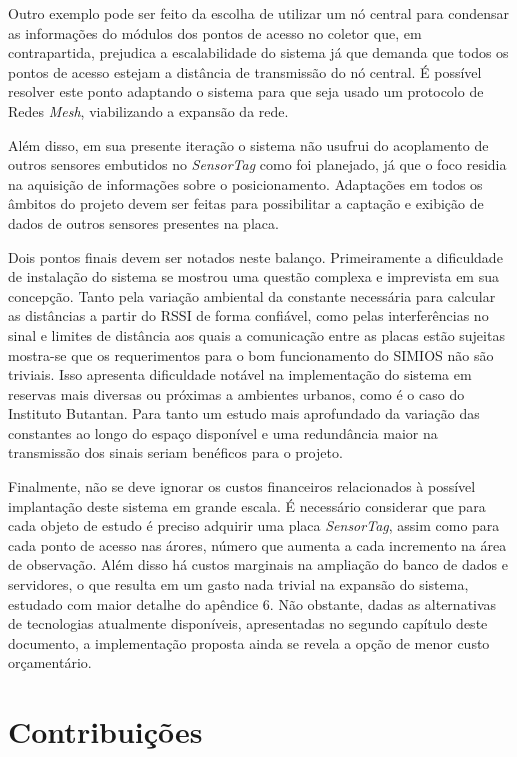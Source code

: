 Outro exemplo pode ser feito da escolha de utilizar um nó central para condensar as informações do módulos dos pontos de acesso no coletor que, em contrapartida, prejudica a escalabilidade do sistema já que demanda que todos os pontos de acesso estejam a distância de transmissão do nó central. É possível resolver este ponto adaptando o sistema para que seja usado um protocolo de Redes \emph{Mesh}, viabilizando a expansão da rede.

Além disso, em sua presente iteração o sistema não usufrui do acoplamento de outros sensores embutidos no \emph{SensorTag} como foi planejado, já que o foco residia na aquisição de informações sobre o posicionamento. Adaptações em todos os âmbitos do projeto devem ser feitas para possibilitar a captação e exibição de dados de outros sensores presentes na placa.

Dois pontos finais devem ser notados neste balanço. Primeiramente a dificuldade de instalação do sistema se mostrou uma questão complexa e imprevista em sua concepção. Tanto pela variação ambiental da constante necessária para calcular as distâncias a partir do RSSI de forma confiável, como pelas interferências no sinal e limites de distância aos quais a comunicação entre as placas estão sujeitas mostra-se que os requerimentos para o bom funcionamento do SIMIOS não são triviais. Isso apresenta dificuldade notável na implementação do sistema em reservas mais diversas ou próximas a ambientes urbanos, como é o caso do Instituto Butantan. Para tanto um estudo mais aprofundado da variação das constantes ao longo do espaço disponível e uma redundância maior na transmissão dos sinais seriam benéficos para o projeto.

Finalmente, não se deve ignorar os custos financeiros relacionados à possível implantação deste sistema em grande escala. É necessário considerar que para cada objeto de estudo é preciso adquirir uma placa \emph{SensorTag}, assim como para cada ponto de acesso nas árores, número que aumenta a cada incremento na área de observação. Além disso há custos marginais na ampliação do banco de dados e servidores, o que resulta em um gasto nada trivial na expansão do sistema, estudado com maior detalhe do apêndice 6. Não obstante, dadas as alternativas de tecnologias atualmente disponíveis, apresentadas no segundo capítulo deste documento, a implementação proposta ainda se revela a opção de menor custo orçamentário.

\section{Contribuições}

